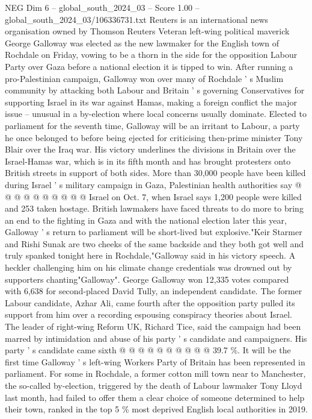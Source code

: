 \begin{textsample}{NEG Dim 6 – global\_south\_2024\_03 – Score 1.00 – global\_south\_2024\_03/106336731.txt}  \label{ex:f6_neg_395}
Reuters is an international news organisation owned by Thomson Reuters Veteran left-wing political maverick George Galloway was elected as the new lawmaker for the English town of Rochdale on Friday, vowing to be a thorn in the side for the opposition Labour Party over Gaza before a national election it is tipped to win.
After running a pro-Palestinian campaign, Galloway won over many of Rochdale ' s Muslim community by attacking both Labour and Britain ' s governing Conservatives for supporting Israel in its war against Hamas, making a foreign conflict the major issue -- unusual in a by-election where local concerns usually dominate.
Elected to parliament for the seventh time, Galloway will be an irritant to Labour, a party he once belonged to before being ejected for criticising then-prime minister Tony Blair over the Iraq war.
His victory underlines the divisions in Britain over the Israel-Hamas war, which is in its fifth month and has brought protesters onto British streets in support of both sides.
More than 30,000 people have been killed during Israel ' s military campaign in Gaza, Palestinian health authorities say @ @ @ @ @ @ @ @ @ @ Israel on Oct. 7, when Israel says 1,200 people were killed and 253 taken hostage.
British lawmakers have faced threats to do more to bring an end to the fighting in Gaza and with the national election later this year, Galloway ' s return to parliament will be short-lived but explosive."Keir Starmer and Rishi Sunak are two cheeks of the same backside and they both got well and truly spanked tonight here in Rochdale,"Galloway said in his victory speech.
A heckler challenging him on his climate change credentials was drowned out by supporters chanting"Galloway".
George Galloway won 12,335 votes compared with 6,638 for second-placed David Tully, an independent candidate.
The former Labour candidate, Azhar Ali, came fourth after the opposition party pulled its support from him over a recording espousing conspiracy theories about Israel.
The leader of right-wing Reform UK, Richard Tice, said the campaign had been marred by intimidation and abuse of his party ' s candidate and campaigners.
His party ' s candidate came sixth @ @ @ @ @ @ @ @ @ @ 39.7 \%.
It will be the first time Galloway ' s left-wing Workers Party of Britain has been represented in parliament.
For some in Rochdale, a former cotton mill town near to Manchester, the so-called by-election, triggered by the death of Labour lawmaker Tony Lloyd last month, had failed to offer them a clear choice of someone determined to help their town, ranked in the top 5 \% most deprived English local authorities in 2019.

\end{textsample}
